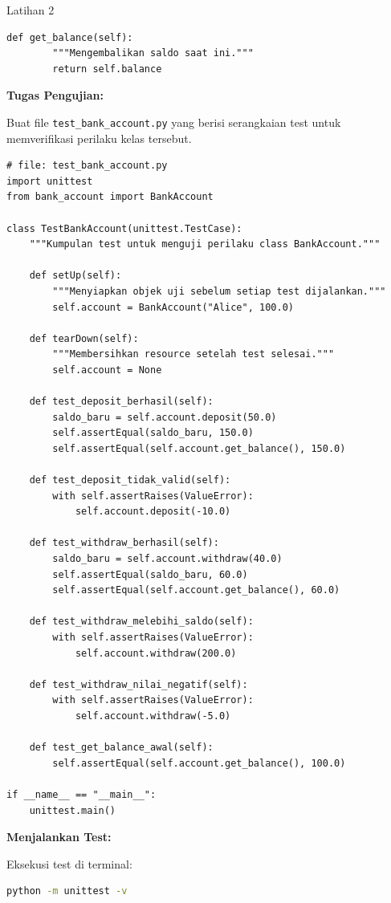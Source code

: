 \documentclass[aspectratio=169, table]{beamer}
\begin{document}
\begin{frame}[fragile,allowframebreaks=0.8]{Latihan 2}
\begin{lstlisting}[style=PythonStyle, breaklines=true]
    def get_balance(self):
        """Mengembalikan saldo saat ini."""
        return self.balance
\end{lstlisting}

\medskip\textbf{Tugas Pengujian:}\par 

Buat file \texttt{test\_bank\_account.py} yang berisi serangkaian test untuk memverifikasi perilaku kelas tersebut.

\begin{lstlisting}[style=PythonStyle, breaklines=true]
# file: test_bank_account.py
import unittest
from bank_account import BankAccount

class TestBankAccount(unittest.TestCase):
    """Kumpulan test untuk menguji perilaku class BankAccount."""

    def setUp(self):
        """Menyiapkan objek uji sebelum setiap test dijalankan."""
        self.account = BankAccount("Alice", 100.0)

    def tearDown(self):
        """Membersihkan resource setelah test selesai."""
        self.account = None

    def test_deposit_berhasil(self):
        saldo_baru = self.account.deposit(50.0)
        self.assertEqual(saldo_baru, 150.0)
        self.assertEqual(self.account.get_balance(), 150.0)

    def test_deposit_tidak_valid(self):
        with self.assertRaises(ValueError):
            self.account.deposit(-10.0)

    def test_withdraw_berhasil(self):
        saldo_baru = self.account.withdraw(40.0)
        self.assertEqual(saldo_baru, 60.0)
        self.assertEqual(self.account.get_balance(), 60.0)

    def test_withdraw_melebihi_saldo(self):
        with self.assertRaises(ValueError):
            self.account.withdraw(200.0)

    def test_withdraw_nilai_negatif(self):
        with self.assertRaises(ValueError):
            self.account.withdraw(-5.0)

    def test_get_balance_awal(self):
        self.assertEqual(self.account.get_balance(), 100.0)

if __name__ == "__main__":
    unittest.main()
\end{lstlisting}

\medskip\textbf{Menjalankan Test:}\par 
Eksekusi test di terminal:

\begin{lstlisting}[language=bash, breaklines=true, basicstyle=\ttfamily\scriptsize]
python -m unittest -v
\end{lstlisting}


\end{frame}
\end{document}
